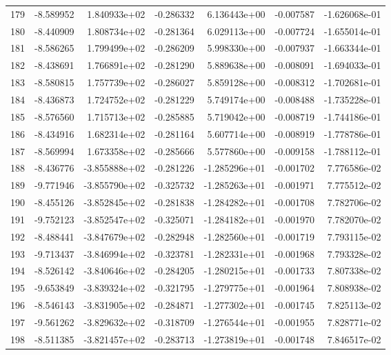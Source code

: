 \begin{tabular}{rrrrrrr}
 179 &  -8.589952 &  1.840933e+02 & -0.286332 &  6.136443e+00 &  -0.007587 & -1.626068e-01 \\
 180 &  -8.440909 &  1.808734e+02 & -0.281364 &  6.029113e+00 &  -0.007724 & -1.655014e-01 \\
 181 &  -8.586265 &  1.799499e+02 & -0.286209 &  5.998330e+00 &  -0.007937 & -1.663344e-01 \\
 182 &  -8.438691 &  1.766891e+02 & -0.281290 &  5.889638e+00 &  -0.008091 & -1.694033e-01 \\
 183 &  -8.580815 &  1.757739e+02 & -0.286027 &  5.859128e+00 &  -0.008312 & -1.702681e-01 \\
 184 &  -8.436873 &  1.724752e+02 & -0.281229 &  5.749174e+00 &  -0.008488 & -1.735228e-01 \\
 185 &  -8.576560 &  1.715713e+02 & -0.285885 &  5.719042e+00 &  -0.008719 & -1.744186e-01 \\
 186 &  -8.434916 &  1.682314e+02 & -0.281164 &  5.607714e+00 &  -0.008919 & -1.778786e-01 \\
 187 &  -8.569994 &  1.673358e+02 & -0.285666 &  5.577860e+00 &  -0.009158 & -1.788112e-01 \\
 188 &  -8.436776 & -3.855888e+02 & -0.281226 & -1.285296e+01 &  -0.001702 &  7.776586e-02 \\
 189 &  -9.771946 & -3.855790e+02 & -0.325732 & -1.285263e+01 &  -0.001971 &  7.775512e-02 \\
 190 &  -8.455126 & -3.852845e+02 & -0.281838 & -1.284282e+01 &  -0.001708 &  7.782706e-02 \\
 191 &  -9.752123 & -3.852547e+02 & -0.325071 & -1.284182e+01 &  -0.001970 &  7.782070e-02 \\
 192 &  -8.488441 & -3.847679e+02 & -0.282948 & -1.282560e+01 &  -0.001719 &  7.793115e-02 \\
 193 &  -9.713437 & -3.846994e+02 & -0.323781 & -1.282331e+01 &  -0.001968 &  7.793328e-02 \\
 194 &  -8.526142 & -3.840646e+02 & -0.284205 & -1.280215e+01 &  -0.001733 &  7.807338e-02 \\
 195 &  -9.653849 & -3.839324e+02 & -0.321795 & -1.279775e+01 &  -0.001964 &  7.808938e-02 \\
 196 &  -8.546143 & -3.831905e+02 & -0.284871 & -1.277302e+01 &  -0.001745 &  7.825113e-02 \\
 197 &  -9.561262 & -3.829632e+02 & -0.318709 & -1.276544e+01 &  -0.001955 &  7.828771e-02 \\
 198 &  -8.511385 & -3.821457e+02 & -0.283713 & -1.273819e+01 &  -0.001748 &  7.846517e-02 \\

\end{tabular}
